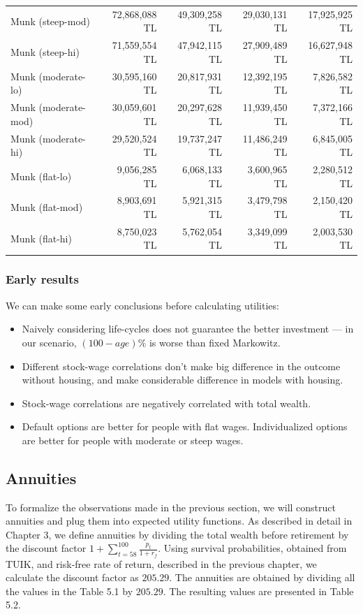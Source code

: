 \documentclass[]{elsarticle}
\begin{document}
\begin{table}[h!]
\begin{tabular}[c]{lrrrr}
Munk (steep-mod)&72,868,088 TL&49,309,258 TL&29,030,131 TL&17,925,925 TL\\
Munk (steep-hi)&71,559,554 TL&47,942,115 TL&27,909,489 TL&16,627,948 TL\\
Munk (moderate-lo)&30,595,160 TL&20,817,931 TL&12,392,195 TL&7,826,582 TL\\
Munk (moderate-mod)&30,059,601 TL&20,297,628 TL&11,939,450 TL&7,372,166 TL\\
Munk (moderate-hi)&29,520,524 TL&19,737,247 TL&11,486,249 TL&6,845,005 TL\\
Munk (flat-lo)&9,056,285 TL&6,068,133 TL&3,600,965 TL&2,280,512 TL\\
Munk (flat-mod)&8,903,691 TL&5,921,315 TL&3,479,798 TL&2,150,420 TL\\
Munk (flat-hi)&8,750,023 TL&5,762,054 TL&3,349,099 TL&2,003,530 TL\\
		\hline
	\end{tabular}
\end{table}

\subsubsection{Early results}

We can make some early conclusions before calculating utilities:

\begin{itemize}
\item Naively considering life-cycles does not guarantee the better investment --- in our scenario, $(100-age)\%$ is worse than fixed Markowitz.
\item Different stock-wage correlations don't make big difference in the outcome without housing, and make considerable difference in models with housing.
\item Stock-wage correlations are negatively correlated with total wealth.
\item Default options are better for people with flat wages. Individualized options are better for people with moderate or steep wages.
\end{itemize}

\subsection{Annuities}
To formalize the observations made in the previous section, we will construct annuities and plug them into expected utility functions. As described in detail in Chapter 3, we define annuities by dividing the total wealth before retirement by the discount factor $1 + \sum^{100}_{t=58}\frac{p_t}{1+r_f}$. Using survival probabilities, obtained from TUIK, and risk-free rate of return, described in the previous chapter, we calculate the discount factor as $205.29$. The annuities are obtained by dividing all the values in the Table 5.1 by $205.29$. The resulting values are presented in Table 5.2. 
\end{document}

